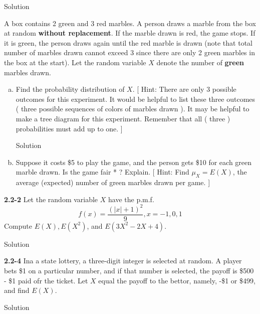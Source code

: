 \documentclass{article}
\begin{document}
\begin{spacing}{1.1}
\begin{homeworkProblem}
\begin{homeworkSection}{Solution}
	\end{homeworkSection}
\end{homeworkProblem}
\begin{homeworkProblem}
	A box contains 2 green and 3 red marbles. A person draws a marble from the box at random {\bf without replacement}. If the marble drawn is red, the game stops. If it is green, the person draws again until the red marble is drawn (note that total number of marbles drawn cannot exceed 3 since there are only 2 green marbles in the box at the start). Let the random variable $X$ denote the number of {\bf green} marbles drawn.
	\begin{enumerate}[(a)]
		\item Find the probability distribution of $X$. [ Hint: There are only 3 possible outcomes for this experiment. It would be helpful to list these three outcomes ( three possible sequences of colors of marbles drawn ). It may be helpful to make a tree diagram for this experiment. Remember that all ( three ) probabilities must add up to one. ]
			\begin{homeworkSection}{Solution}
		
			\end{homeworkSection}
		\item Suppose it costs \$5 to play the game, and the person gets \$10 for each green marble
drawn. Is the game fair * ? Explain. [ Hint: Find  $\mu_X = E(X)$, the average (expected) number of green marbles drawn per game. ]
	\end{enumerate}
\end{homeworkProblem}
\begin{homeworkProblem}
	{\bf 2.2-2}	Let the random variable $X$ have the p.m.f. 
	\[f\left( x \right) = \frac{{{{\left( {\left| x \right| + 1} \right)}^2}}}{9},x =  - 1,0,1\]
	Compute $E(X),E(X^2)$, and $E(3X^2 - 2X +4)$.
	\begin{homeworkSection}{Solution}
		
	\end{homeworkSection}
\end{homeworkProblem}
\begin{homeworkProblem}
	{\bf 2.2-4} Ina a state lottery, a three-digit integer is selected at random.  A player bets \$1 on a particular number, and if that number is selected, the payoff is \$500 - \$1 paid ofr the ticket.  Let $X$ equal the payoff to the bettor, namely, -\$1 or \$499, and find $E(X)$.  
	\begin{homeworkSection}{Solution}
		

\end{homeworkSection}
\end{homeworkProblem}
\end{spacing}
\end{document}
